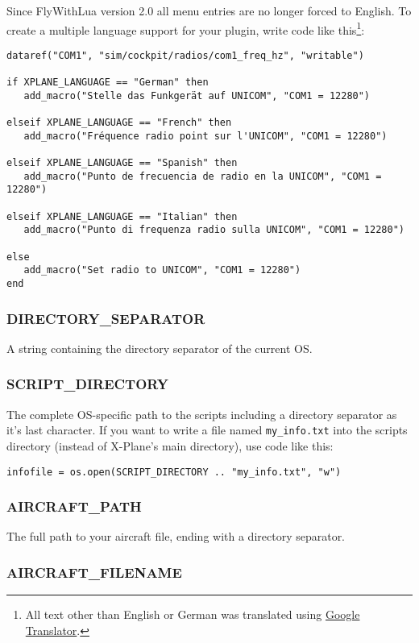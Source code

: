 \documentclass[11pt,parskip=half,a4paper]{scrartcl}
\begin{document}
\newpage
Since FlyWithLua version 2.0 all menu entries are no longer forced to English. To create a multiple language support for your plugin, write code like this\footnote{All text other than English or German was translated using \href{http://translate.google.com/}{Google Translator}.}:

\begin{lstlisting}
dataref("COM1", "sim/cockpit/radios/com1_freq_hz", "writable")

if XPLANE_LANGUAGE == "German" then
   add_macro("Stelle das Funkgerät auf UNICOM", "COM1 = 12280")

elseif XPLANE_LANGUAGE == "French" then
   add_macro("Fréquence radio point sur l'UNICOM", "COM1 = 12280")

elseif XPLANE_LANGUAGE == "Spanish" then
   add_macro("Punto de frecuencia de radio en la UNICOM", "COM1 = 12280")

elseif XPLANE_LANGUAGE == "Italian" then
   add_macro("Punto di frequenza radio sulla UNICOM", "COM1 = 12280")

else
   add_macro("Set radio to UNICOM", "COM1 = 12280")
end
\end{lstlisting}

\subsubsection{DIRECTORY\_SEPARATOR}

A string containing the directory separator of the current OS.

\subsubsection{SCRIPT\_DIRECTORY}

The complete OS-specific path to the scripts including a directory separator as it's last character. If you want to write a file named \verb|my_info.txt| into the scripts directory (instead of X-Plane's main directory), use code like this:

\verb|infofile = os.open(SCRIPT_DIRECTORY .. "my_info.txt", "w")|

\subsubsection{AIRCRAFT\_PATH}

The full path to your aircraft file, ending with a directory separator.

\subsubsection{AIRCRAFT\_FILENAME}
\end{document}
